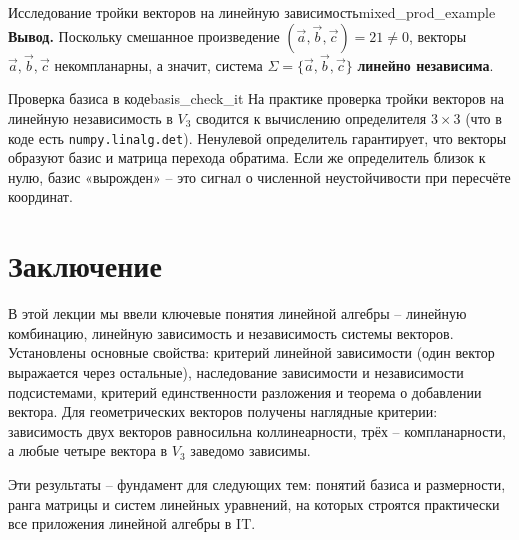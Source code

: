 \documentclass[12pt,a4paper]{article}
\begin{document}
\begin{definition}{Исследование тройки векторов на линейную
зависимость}{mixed_prod_example}
\textbf{Вывод.} Поскольку смешанное произведение $(\vec{a}, \vec{b},
\vec{c}) = 21 \neq 0$, векторы $\vec{a}, \vec{b}, \vec{c}$
некомпланарны, а значит, система $\Sigma = \{\vec{a}, \vec{b}, \vec{c}\}$
\textbf{линейно независима}.
\end{definition}

\begin{remarkIT}{Проверка базиса в коде}{basis_check_it}
На практике проверка тройки векторов на линейную независимость в $V_3$
сводится к вычислению определителя $3\times 3$ (что в коде есть
\texttt{numpy.linalg.det}). Ненулевой определитель гарантирует, что
векторы образуют базис и матрица перехода обратима. Если же
определитель близок к нулю, базис «вырожден» -- это сигнал о численной
неустойчивости при пересчёте координат.
\end{remarkIT}

\section*{Заключение}

В этой лекции мы ввели ключевые понятия линейной алгебры -- линейную
комбинацию, линейную зависимость и независимость системы векторов.
Установлены основные свойства: критерий линейной зависимости (один вектор
выражается через остальные), наследование зависимости и независимости
подсистемами, критерий единственности разложения и теорема о добавлении
вектора. Для геометрических векторов получены наглядные критерии:
зависимость двух векторов равносильна коллинеарности, трёх --
компланарности, а любые четыре вектора в $V_3$ заведомо зависимы.

Эти результаты -- фундамент для следующих тем: понятий базиса и
размерности, ранга матрицы и систем линейных уравнений, на которых
строятся практически все приложения линейной алгебры в IT.
\end{document}
